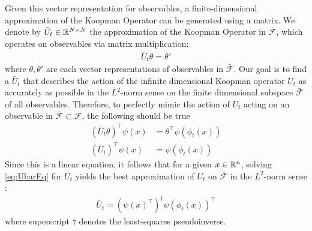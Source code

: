 Given this vector representation for observables, a finite-dimensional approximation of the Koopman Operator can be generated using a matrix.
We denote by $\bar{U}_t \in \mathbb{R}^{N \times N}$ the approximation of the Koopman Operator in $\bar{\mathcal{F}}$, which operates on observables via matrix multiplication:
\begin{align}
    \bar{U}_t \theta = \theta'
\end{align}
where $\theta , \theta'$ are each vector representations of observables in $\bar{\mathcal{F}}$.
Our goal is to find a $\bar{U}_t$ that describes the action of the infinite dimensional Koopman operator $U_t$ as accurately as possible in the $L^2$-norm sense on the finite dimensional subspace $\bar{\mathcal{F}}$  of all observables.
Therefore, to perfectly mimic the action of $U_t$ acting on an observable in $\bar{\mathcal{F}} \subset \mathcal{F}$, the following should be true 
\begin{align}
    ( \bar{U}_t {\theta} )^\top {\psi}(x) &=
    {\theta}^\top {\psi} \left( \phi_t(x) \right) \\
    ( \bar{U}_t )^\top \psi(x) &= {\psi} \left( \phi_t(x) \right)
    \label{eq:UbarEq}
\end{align}
Since this is a linear equation, it follows that for a given ${x \in \mathbb{R}^n}$, solving \eqref{eq:UbarEq} for $\bar{U}_t$ yields the best approximation of $U_t$ on $\bar{\mathcal{F}}$ in the $L^2$-norm sense :
\begin{align}
    \bar{U}_t = \left( {\psi}(x)^\top \right)^\dagger {\psi}( \phi_t(x) )^\top
    \label{eq:Uapprox}
\end{align}
where superscript $\dagger$ denotes the least-squares pseudoinverse.

